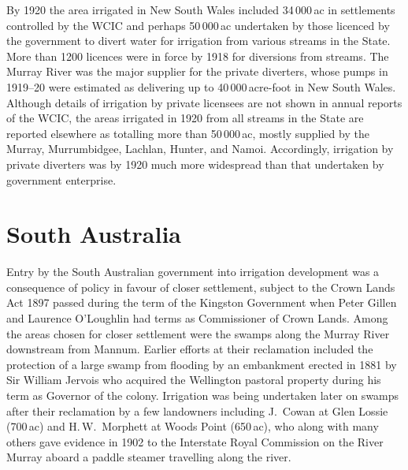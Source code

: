 By 1920 the area irrigated in New South Wales included 34\,000\,ac in
settlements controlled by the WCIC and perhaps 50\,000\,ac undertaken
by those licenced by the government to divert water for irrigation
from various streams in the State.  More than 1200 licences were in
force by 1918 for diversions from streams.  The Murray River was the major supplier for the
private diverters, whose pumps in 1919--20 were estimated as
delivering up to 40\,000\,acre-foot in New South Wales.
Although details of irrigation by private licensees are not shown in
annual reports of the WCIC, the areas irrigated in 1920 from all
streams in the State are reported elsewhere as totalling more than
50\,000\,ac, mostly supplied by the Murray, Murrumbidgee, Lachlan,
Hunter, and Namoi.
Accordingly, irrigation by private diverters was by 1920 much more
widespread than that undertaken by government enterprise.

\section*{South Australia}

Entry by the South Australian government into irrigation development
was a consequence of policy in favour of closer settlement, subject to
the Crown Lands Act 1897 passed during the term of the Kingston
Government when Peter Gillen and Laurence O'Loughlin had terms as
Commissioner of Crown Lands.  Among the areas chosen for closer
settlement were the swamps along the Murray River downstream from
Mannum.  Earlier efforts at their reclamation included the protection
of a large swamp from flooding by an embankment erected in 1881 by Sir
William Jervois who acquired the Wellington pastoral property during
his term as Governor of the colony.  Irrigation was being undertaken
later on swamps after their reclamation by a few landowners including
J.~Cowan at Glen Lossie (700\,ac) and H.\,W.~Morphett at Woods Point
(650\,ac), who along with many others gave evidence in 1902 to the
Interstate Royal Commission on the River Murray aboard a paddle
steamer travelling along the river.

